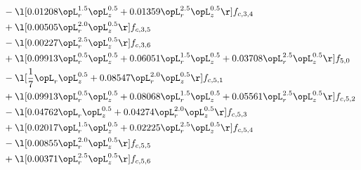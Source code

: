 \begin{alignat}{2}
& - \l[  0.01208 \opL_r^{1.5} \opL_z^{0.5} +  0.01359 \opL_r^{2.5} \opL_z^{0.5}  \r] f_{c,3,4} \nonumber \\ 
& + \l[  0.00505 \opL_r^{2.0} \opL_z^{0.5}  \r] f_{c,3,5} \nonumber \\ 
& - \l[  0.00227 \opL_r^{2.5} \opL_z^{0.5}  \r] f_{c,3,6} \nonumber \\ 
& + \l[  0.09913 \opL_r^{0.5} \opL_z^{0.5} +  0.06051 \opL_r^{1.5} \opL_z^{0.5} +  0.03708 \opL_r^{2.5} \opL_z^{0.5}  \r] f_{5,0} \nonumber \\ 
& - \l[ \frac{1}{7} \opL_r \opL_z^{0.5} +  0.08547 \opL_r^{2.0} \opL_z^{0.5}  \r] f_{c,5,1} \nonumber \\ 
& + \l[  0.09913 \opL_r^{0.5} \opL_z^{0.5} +  0.08068 \opL_r^{1.5} \opL_z^{0.5} +  0.05561 \opL_r^{2.5} \opL_z^{0.5}  \r] f_{c,5,2} \nonumber \\ 
& - \l[  0.04762 \opL_r \opL_z^{0.5} +  0.04274 \opL_r^{2.0} \opL_z^{0.5}  \r] f_{c,5,3} \nonumber \\ 
& + \l[  0.02017 \opL_r^{1.5} \opL_z^{0.5} +  0.02225 \opL_r^{2.5} \opL_z^{0.5}  \r] f_{c,5,4} \nonumber \\ 
& - \l[  0.00855 \opL_r^{2.0} \opL_z^{0.5}  \r] f_{c,5,5} \nonumber \\ 
& + \l[  0.00371 \opL_r^{2.5} \opL_z^{0.5}  \r] f_{c,5,6} \nonumber \\ 
\end{alignat} 


